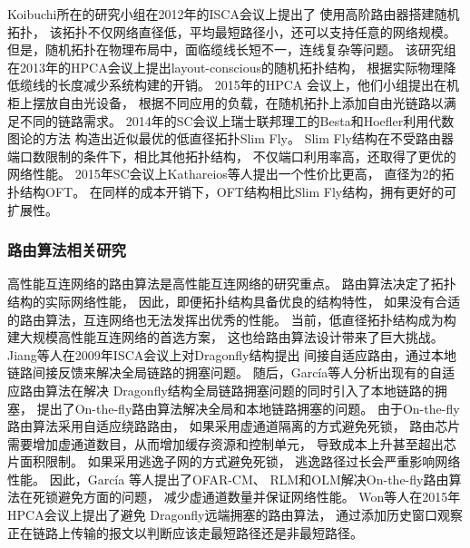 Koibuchi所在的研究小组在2012年的ISCA会议上提出了
使用高阶路由器搭建随机拓扑，
该拓扑不仅网络直径低，平均最短路径小，还可以支持任意的网络规模。
但是，随机拓扑在物理布局中，面临缆线长短不一，连线复杂等问题。
该研究组在2013年的HPCA会议上提出layout-conscious的随机拓扑结构，
根据实际物理降低缆线的长度减少系统构建的开销。
2015年的HPCA 会议上，他们小组提出在机柜上摆放自由光设备，
根据不同应用的负载，在随机拓扑上添加自由光链路以满足不同的链路需求。
2014年的SC会议上瑞士联邦理工的Besta和Hoefler利用代数图论的方法
构造出近似最优的低直径拓扑Slim Fly。
Slim Fly结构在不受路由器端口数限制的条件下，相比其他拓扑结构，
不仅端口利用率高，还取得了更优的网络性能。
2015年SC会议上Kathareios等人提出一个性价比更高，
直径为2的拓扑结构OFT。
在同样的成本开销下，OFT结构相比Slim Fly结构，拥有更好的可扩展性。

\subsubsection{路由算法相关研究}
高性能互连网络的路由算法是高性能互连网络的研究重点。
路由算法决定了拓扑结构的实际网络性能，
因此，即便拓扑结构具备优良的结构特性，
如果没有合适的路由算法，互连网络也无法发挥出优秀的性能。
当前，低直径拓扑结构成为构建大规模高性能互连网络的首选方案，
这也给路由算法设计带来了巨大挑战。
Jiang等人在2009年ISCA会议上对Dragonfly结构提出
间接自适应路由，通过本地链路间接反馈来解决全局链路的拥塞问题。
随后，Garc\'ia等人分析出现有的自适应路由算法在解决
Dragonfly结构全局链路拥塞问题的同时引入了本地链路的拥塞，
提出了On-the-fly路由算法解决全局和本地链路拥塞的问题。
由于On-the-fly路由算法采用自适应绕路路由，
如果采用虚通道隔离的方式避免死锁，
路由芯片需要增加虚通道数目，从而增加缓存资源和控制单元，
导致成本上升甚至超出芯片面积限制。
如果采用逃逸子网的方式避免死锁，
逃逸路径过长会严重影响网络性能。
因此，Garc\'ia 等人提出了OFAR-CM、
RLM和OLM解决On-the-fly路由算法在死锁避免方面的问题，
减少虚通道数量并保证网络性能。
Won等人在2015年HPCA会议上提出了避免
Dragonfly远端拥塞的路由算法，
通过添加历史窗口观察正在链路上传输的报文以判断应该走最短路径还是非最短路径。

